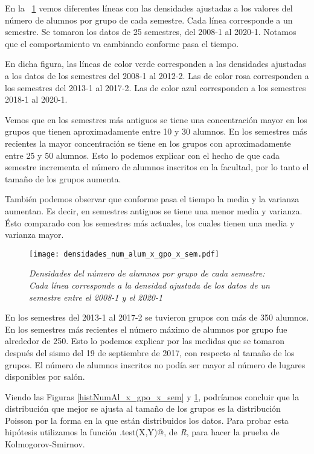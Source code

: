 En la \figurename{~\ref{densidadesNumAl_x_gpo_x_sem}} vemos diferentes líneas con las densidades ajustadas a los valores del número de alumnos por grupo de cada semestre. Cada línea corresponde a un semestre. Se tomaron los datos de 25 semestres, del 2008-1 al 2020-1. Notamos que el comportamiento va cambiando conforme pasa el tiempo.

En dicha figura, las líneas de color verde corresponden a las densidades ajustadas a los datos de los semestres del 2008-1 al 2012-2. Las de color rosa corresponden a los semestres del 2013-1 al 2017-2. Las de color azul corresponden a los semestres 2018-1 al 2020-1.

Vemos que en los semestres más antiguos se tiene una concentración mayor en los grupos que tienen aproximadamente entre 10 y 30 alumnos. En los semestres más recientes la mayor concentración se tiene en los grupos con aproximadamente entre 25 y 50 alumnos. Esto lo podemos explicar con el hecho de que cada semestre incrementa el número de alumnos inscritos en la facultad, por lo tanto el tamaño de los grupos aumenta.

También podemos observar que conforme pasa el tiempo la media y la varianza aumentan. Es decir, en semestres antiguos se tiene una menor media y varianza. Ésto comparado con los semestres más actuales, los cuales tienen una media y varianza mayor.

\begin{figure}[H]
\centering
\texttt{[image: densidades\_num\_alum\_x\_gpo\_x\_sem.pdf]} %
\caption[\textit{Densidades del número de alumnos por grupo de cada semestre}]{\textit{Densidades del número de alumnos por grupo de cada semestre: Cada línea corresponde a la densidad ajustada de los datos de un semestre entre el 2008-1 y el 2020-1}}\label{densidadesNumAl_x_gpo_x_sem}
\end{figure}

En los semestres del 2013-1 al 2017-2 se tuvieron grupos con más de 350 alumnos. En los semestres más recientes el número máximo de alumnos por grupo fue alrededor de 250. Esto lo podemos explicar por las medidas que se tomaron después del sismo del 19 de septiembre de 2017, con respecto al tamaño de los grupos. El número de alumnos inscritos no podía ser mayor al número de lugares disponibles por salón.

Viendo las Figuras \ref{histNumAl_x_gpo_x_sem} y \ref{densidadesNumAl_x_gpo_x_sem}, podríamos concluir que la distribución que mejor se ajusta al tamaño de los grupos es la distribución Poisson por la forma en la que están distribuidos los datos. Para probar esta hipótesis utilizamos la función \verb@ks.test(X,Y)@, de \textit{R}, para hacer la prueba de Kolmogorov-Smirnov.


